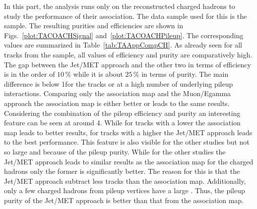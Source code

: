 In this part, the analysis runs only on the reconstructed charged hadrons to study the performance of their association. The data sample used for this is the \ttbar sample. The resulting purities and efficiencies are shown in Figs.~\ref{plot:TACOACHSignal} and~\ref{plot:TACOACHPileup}.  The corresponding values are summarized in Table~\ref{tab:TAAppCompCH}. As already seen for all tracks from the \ttbar sample, all values of efficiency and purity are comparatively high. The gap between the Jet/MET approach and the other two in terms of efficiency is in the order of $10\,\%$ while it is about $25\,\%$ in terms of purity. The main difference is below 1\GeV for the tracks \pt or at a high number of underlying pileup interactions. Comparing only the association map and the Muon/Egamma approach the association map is either better or leads to the same results. \\
Considering the combination of the pileup efficiency and purity an interesting feature can be seen at around 4\GeV{}. While for tracks with a lower \pt{} the association map leads to better results, for tracks with a higher \pt{} the Jet/MET approach leads to the best performance. This feature is also visible for the other studies but not so large and because of the pileup purity. While for the other studies the Jet/MET approach leads to similar results as the association map for the charged hadrons only the former is significantly better. The reason for this is that the Jet/MET approach subtract less tracks than the association map. Additionally, only a few charged hadrons from pileup vertices have a large \pt{}. Thus, the pileup purity of the Jet/MET approach is better than that from the association map.


